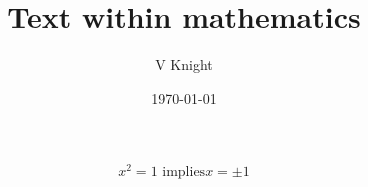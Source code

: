\documentclass{article}
\title{Text within mathematics}
\author{V Knight}
\date{\today}
\begin{document}
\maketitle

\[
	x^2 = 1 \text{ implies} x=\pm 1
\]
\end{document}
